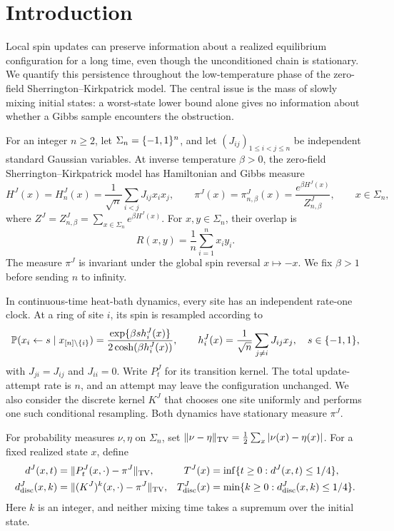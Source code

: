 \section{Introduction}\label{sec:introduction}

Local spin updates can preserve information about a realized equilibrium
configuration for a long time, even though the unconditioned chain is
stationary. We quantify this persistence throughout the low-temperature
phase of the zero-field Sherrington--Kirkpatrick model. The central issue
is the mass of slowly mixing initial states: a worst-state lower bound
alone gives no information about whether a Gibbs sample encounters the
obstruction.

For an integer $n\ge2$, let $\Sigma_n=\{-1,1\}^n$, and let
$(J_{ij})_{1\le i<j\le n}$ be independent standard Gaussian variables.
At inverse temperature $\beta>0$, the zero-field
Sherrington--Kirkpatrick model has Hamiltonian and Gibbs measure
\begin{equation}\label{eq:model}
 H^J(x)=H_n^J(x)=\frac1{\sqrt n}\sum_{i<j}J_{ij}x_ix_j,
 \qquad
 \pi^J(x)=\pi_{n,\beta}^J(x)
       =\frac{e^{\beta H^J(x)}}{Z_{n,\beta}^J},
 \qquad x\in\Sigma_n,
\end{equation}
where $Z^J=Z_{n,\beta}^J=\sum_{x\in\Sigma_n}e^{\beta H^J(x)}$.
For $x,y\in\Sigma_n$, their overlap is
\[
 R(x,y)=\frac1n\sum_{i=1}^n x_i y_i.
\]
The measure $\pi^J$ is invariant under the global spin reversal
$x\mapsto-x$. We fix $\beta>1$ before sending $n$ to infinity.

In continuous-time heat-bath dynamics, every site has an independent
rate-one clock. At a ring of site $i$, its spin is resampled according to
\[
 \mathbb P(x_i\gets s\mid x_{[n]\setminus\{i\}})
  =\frac{\exp\{\beta s h_i^J(x)\}}
         {2\cosh(\beta h_i^J(x))},
 \qquad
 h_i^J(x)=\frac1{\sqrt n}\sum_{j\ne i}J_{ij}x_j,
 \quad s\in\{-1,1\},
\]
with $J_{ji}=J_{ij}$ and $J_{ii}=0$. Write $P_t^J$ for its transition
kernel. The total update-attempt rate is $n$, and an attempt may leave
the configuration unchanged. We also consider the discrete kernel $K^J$
that chooses one site uniformly and performs one such conditional
resampling. Both dynamics have stationary measure $\pi^J$.

For probability measures $\nu,\eta$ on $\Sigma_n$, set
$\lVert \nu-\eta\rVert_{\mathrm{TV}}=\frac12\sum_x|\nu(x)-\eta(x)|$.
For a fixed realized state $x$, define
\begin{align}
 d^J(x,t)&=\lVert P_t^J(x,\cdot)-\pi^J\rVert_{\mathrm{TV}},
 &T^J(x)&=\inf\{t\ge0:d^J(x,t)\le1/4\},
 \label{eq:point-mixing-time}\\
 d_{\mathrm{disc}}^J(x,k)&=
      \lVert (K^J)^k(x,\cdot)-\pi^J\rVert_{\mathrm{TV}},
 &T_{\mathrm{disc}}^J(x)&=
      \min\{k\ge0:d_{\mathrm{disc}}^J(x,k)\le1/4\}.
 \label{eq:point-discrete-mixing-time}
\end{align}
Here $k$ is an integer, and neither mixing time takes a supremum over
the initial state.

